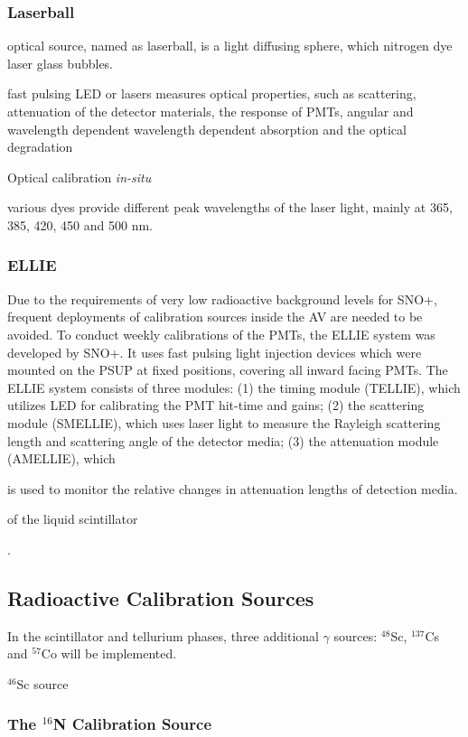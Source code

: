 \subsubsection{Laserball}
optical source, named as laserball, is a light diffusing sphere, which nitrogen dye laser glass bubbles.

fast pulsing LED or lasers
measures optical properties, such as scattering, attenuation of the detector materials, the response of PMTs, 
angular and wavelength dependent
wavelength dependent absorption and the optical degradation

Optical calibration {\emph {in-situ}} 

various dyes provide different peak wavelengths of the laser light, mainly at 365, 385, 420, 450 and 500 nm.

\subsubsection{ELLIE}
Due to the requirements of very low radioactive background levels for SNO+, frequent deployments of calibration sources inside the AV are needed to be avoided. To conduct weekly calibrations of the PMTs, the ELLIE system was developed by SNO+. It uses fast pulsing light injection devices which were mounted on the PSUP at fixed positions, covering all inward facing PMTs. The ELLIE system consists of three modules: (1) the timing module (TELLIE), which utilizes LED for calibrating the PMT hit-time and gains; (2) the scattering module (SMELLIE), which uses laser light to measure the Rayleigh scattering length and scattering angle of the detector media; (3) the attenuation module (AMELLIE), which 

is used to monitor the relative changes in attenuation lengths of detection media.

of the liquid scintillator

\cite{jones2011background,walker2016study,dunger2018topological,snop_jinst}.

\subsection{Radioactive Calibration Sources}



In the scintillator and tellurium phases, three additional $\gamma$ sources: $^{48}$Sc, $^{137}$Cs and $^{57}$Co will be implemented.

$^{46}$Sc source

\subsubsection{The $^{16}$N Calibration Source}

